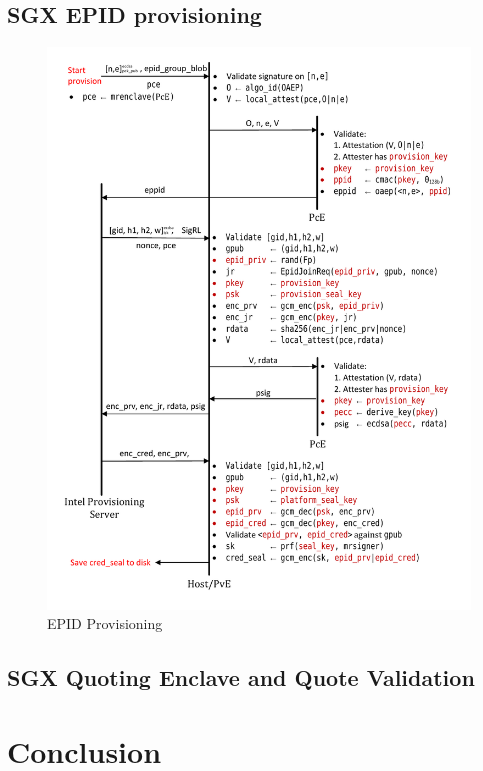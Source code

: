 \documentclass[10pt, letterpaper]{article}
\begin{document}
  \subsection{SGX EPID provisioning}
  \label{ssec:epidprov}

  \begin{figure}
  \centering
  \includegraphics[width=0.8\linewidth]{Diagrams/EpidProvisioning}
  \caption{EPID Provisioning}
  \label{fig:epidprov}
  \end{figure}

  \subsection{SGX Quoting Enclave and Quote Validation}
  \label{ssec:qe}

  \section{Conclusion}
  \label{sec:conclusion}



\end{document}
